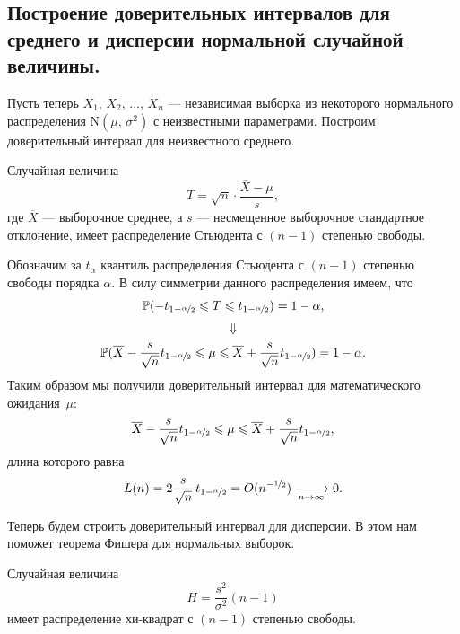 \subsection{Построение доверительных интервалов для среднего и дисперсии нормальной случайной величины.}

Пусть теперь $X_1,\,X_2,\,\ldots,\,X_n$ ---  независимая выборка из некоторого нормального распределения $\mbox{N}(\mu,\,\sigma^2)$ с неизвестными параметрами. Построим доверительный интервал для неизвестного среднего.

\begin{theorem}
        Случайная величина
$$
        T = \sqrt{n} \cdot \frac{\overline X - \mu}{s},
$$
        где $\overline X$ --- выборочное среднее, а $s$ --- несмещенное выборочное стандартное отклонение, имеет распределение Стьюдента с $(n-1)$ степенью свободы.
\end{theorem}

Обозначим за $t_{\alpha}$ квантиль распределения Стьюдента с $(n-1)$ степенью свободы порядка $\alpha$. В силу симметрии данного распределения имеем, что
$$
        \mathbb{P}(-t_{1 - \nicefrac{\alpha}{2}} \leqslant T \leqslant t_{1 - \nicefrac{\alpha}{2}}) = 1 - \alpha,
$$
$$\Downarrow$$
$$
        \mathbb{P}(\overline X - \frac{s}{\sqrt{n}} t_{1 - \nicefrac{\alpha}{2}} \leqslant \mu \leqslant \overline X + \frac{s}{\sqrt{n}} t_{1 - \nicefrac{\alpha}{2}})
        =
        1 - \alpha.
$$
Таким образом мы получили доверительный интервал для математического ожидания~$\mu$:
$$
        \overline X - \frac{s}{\sqrt{n}} t_{1 - \nicefrac{\alpha}{2}} \leqslant \mu \leqslant \overline X + \frac{s}{\sqrt{n}} t_{1 - \nicefrac{\alpha}{2}},
$$
длина которого равна
$$
L(n) = 2\frac{s}{\sqrt{n}}\,t_{1 - \nicefrac{\alpha}{2}} = O(n^{-\nicefrac{1}{2}}) \xrightarrow[n\to\infty]{} 0.
$$

Теперь будем строить доверительный интервал для дисперсии. В этом нам поможет теорема Фишера для нормальных выборок.

\begin{theorem}[Фишер]
        Случайная величина
$$
        H = \frac{s^2}{\sigma^2}(n - 1)
$$
        имеет распределение хи-квадрат с $(n-1)$ степенью свободы.
\end{theorem}

